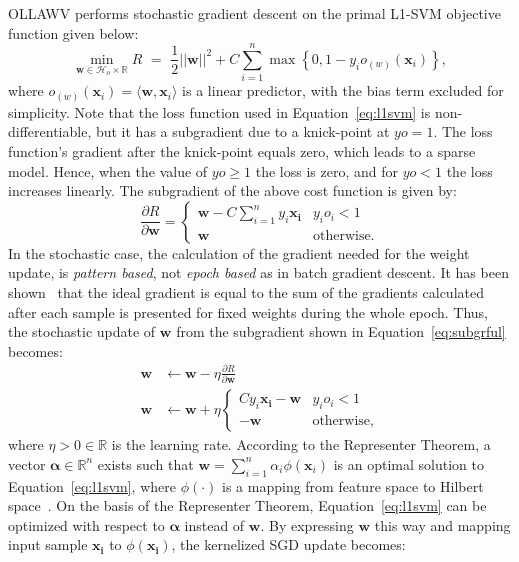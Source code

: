 \documentclass[reqno]{vcuthesis}
\newcommand{\set}[1]{{\left\{#1\right\}}}
\newcommand{\reals}{{\mathbb{R}}}
\numberwithin{equation}{chapter}
\begin{document}
OLLAWV performs stochastic gradient descent on the primal L1-SVM objective function given below:
\begin{equation}
\label{eq:l1svm}
\min\limits_{\bm{w} \in \mathcal{H}_o \times \reals} R {\,\,} = {\,\,} \frac{1}{2}||\bm{w}||^2 + C\sum_{i=1}^n \max \set{0, 1 - y_i o_{(w)}(\bm{x}_i)},
\end{equation}
where $o_{(w)}(\bm{x}_i) = \langle\bm w, \bm x_i\rangle$ is a linear predictor, with the bias term excluded for simplicity. Note that the loss function used in Equation~\ref{eq:l1svm} is non-differentiable, but it has a subgradient due to a knick-point at $yo = 1$. The loss function's gradient after the knick-point equals zero, which leads to a sparse model. Hence, when the value of $yo \geq 1$ the loss is zero, and for $yo < 1$ the loss increases linearly. The subgradient of the above cost function is given by:
\begin{equation}
\label{eq:subgrful}
\frac{\partial R}{\partial \bm w} = \begin{cases} 
						\bm w - C \sum_{i=1}^n y_i \bm{x_i} & y_i o_i < 1 \\
						\bm w & \text{otherwise.}
						\end{cases}
\end{equation}
In the stochastic case, the calculation of the gradient needed for the weight update, is \textit{pattern based}, not \textit{epoch based} as in batch gradient descent. It has been shown~\cite{Kecman2001} that the ideal gradient is equal to the sum of the gradients calculated after each sample is presented for fixed weights during the whole epoch. Thus, the stochastic update of $\bm w$ from the subgradient shown in Equation~\ref{eq:subgrful} becomes:
\begin{align*}
\bm w &\leftarrow \bm w - \eta \frac{\partial R}{\partial \bm w} \\
\bm w &\leftarrow \bm w + \eta \begin{cases} 
															C y_i \bm{x_i} - \bm w & y_i o_i < 1 \\
															-\bm w & \text{otherwise},
													 \end{cases}
\end{align*}
where $\eta > 0 \in \reals $ is the learning rate. According to the Representer Theorem, a vector $\bm \alpha \in \reals^n$ exists such that $\bm w = \sum_{i=1}^n \alpha_i \phi(\bm x_i)$ is an optimal solution to Equation~\ref{eq:l1svm}, where $\phi(\cdot)$ is a mapping from feature space to Hilbert space~\cite{Shalev2014}. On the basis of the Representer Theorem, Equation~\ref{eq:l1svm} can be optimized with respect to $\bm \alpha$ instead of $\bm w$. By expressing $\bm w$ this way and mapping input sample $\bm{x_i}$ to $\phi(\bm{x_i})$, the kernelized SGD update becomes:
\end{document}
